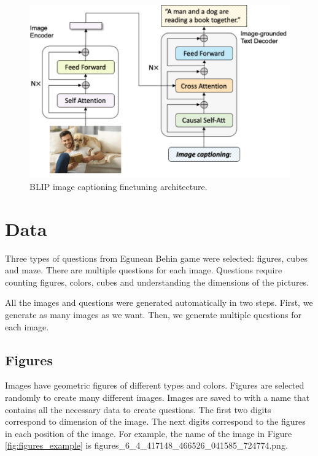 \documentclass[11pt]{article}
\begin{document}
\begin{figure}
    \centering
    \includegraphics[width=\linewidth]{captioning_example.png}
    \caption{BLIP image captioning finetuning architecture.}
    \label{fig:captioning_example}
\end{figure}

\section{Data}

Three types of questions from Egunean Behin game were selected: figures, cubes and maze. There are multiple questions for each image. Questions require counting figures, colors, cubes and understanding the dimensions of the pictures.

All the images and questions were generated automatically in two steps. First, we generate as many images as we want. Then, we generate multiple questions for each image.

\subsection{Figures}

Images have geometric figures of different types and colors. Figures are selected randomly to create many different images. Images are saved to with a name that contains all the necessary data to create questions. The first two digits correspond to dimension of the image. The next digits correspond to the figures in each position of the image. For example, the name of the image in Figure \ref{fig:figures_example} is figures\_6\_4\_417148\_466526\_041585\_724774.png.
\end{document}
